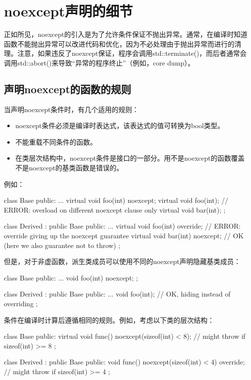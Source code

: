 \section{noexcept声明的细节}
正如所见，noexcept的引入是为了允许条件保证不抛出异常。通常，在编译时知道函数不能抛出异常可以改进代码和优化，因为不必处理由于抛出异常而进行的清理。注意，如果违反了noexcept保证，程序会调用std::terminate()，而后者通常会调用std::abort()来导致“异常的程序终止”（例如，core dump）。

\subsection{声明noexcept的函数的规则}

当声明noexcept条件时，有几个适用的规则：

\begin{itemize}
	\item noexcept条件必须是编译时表达式，该表达式的值可转换为bool类型。
	\item 不能重载不同条件的函数。
	\item 在类层次结构中，noexcept条件是接口的一部分。用不是noexcept的函数覆盖不是noexcept的基类函数是错误的。
\end{itemize}

例如：

\begin{cppcode}
class Base {
	public:
	...
	virtual void foo(int) noexcept;
	virtual void foo(int); // ERROR: overload on different noexcept clause only
	virtual void bar(int);
};

class Derived : public Base {
	public:
	...
	virtual void foo(int) override; // ERROR: override giving up the noexcept guarantee
	virtual void bar(int) noexcept; // OK (here we also guarantee not to throw)
};
\end{cppcode}

但是，对于非虚函数，派生类成员可以使用不同的noexcept声明隐藏基类成员：

\begin{cppcode}
class Base {
	public:
	...
	void foo(int) noexcept;
};

class Derived : public Base {
	public:
	...
	void foo(int); // OK, hiding instead of overriding
};
\end{cppcode}

条件在编译时计算后遵循相同的规则。例如，考虑以下类的层次结构：

\begin{cppcode}
class Base {
	public:
	virtual void func() noexcept(sizeof(int) < 8); // might throw if sizeof(int) >= 8
};

class Derived : public Base {
	public:
	void func() noexcept(sizeof(int) < 4) override; // might throw if sizeof(int) >= 4
};
\end{cppcode}


